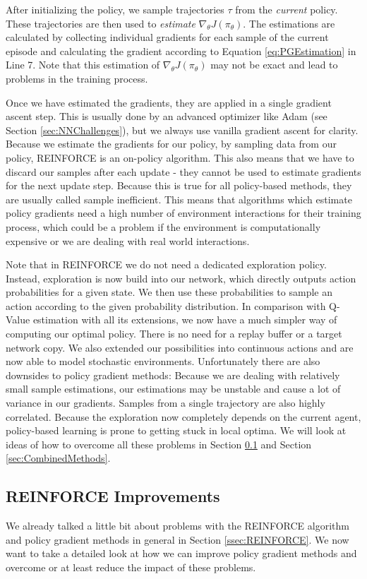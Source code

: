 After initializing the policy, we sample trajectories $\tau$ from the \textit{current} policy. These trajectories are then used to \textit{estimate} $\nabla_\theta J(\pi_\theta)$. The estimations are calculated by collecting individual gradients for each sample of the current episode and calculating the gradient according to Equation \ref{eq:PGEstimation} in Line 7. Note that this estimation of $\nabla_\theta J(\pi_\theta)$ may not be exact and lead to problems in the training process. 

Once we have estimated the gradients, they are applied in a single gradient ascent step. This is usually done by an advanced optimizer like Adam (see Section \ref{sec:NNChallenges}), but we always use vanilla gradient ascent for clarity. Because we estimate the gradients for our policy, by sampling data from our policy, REINFORCE is an on-policy algorithm. This also means that we have to discard our samples after each update - they cannot be used to estimate gradients for the next update step. Because this is true for all policy-based methods, they are usually called sample inefficient. This means that algorithms which estimate policy gradients need a high number of environment interactions for their training process, which could be a problem if the environment is computationally expensive or we are dealing with real world interactions.

Note that in REINFORCE we do not need a dedicated exploration policy. Instead, exploration is now build into our network, which directly outputs action probabilities for a given state. We then use these probabilities to sample an action according to the given probability distribution. In comparison with Q-Value estimation with all its extensions, we now have a much simpler way of computing our optimal policy. There is no need for a replay buffer or a target network copy. We also extended our possibilities into continuous actions and are now able to model stochastic environments. Unfortunately there are also downsides to policy gradient methods: Because we are dealing with relatively small sample estimations, our estimations may be unstable and cause a lot of variance in our gradients. Samples from a single trajectory are also highly correlated. Because the exploration now completely depends on the current agent, policy-based learning is prone to getting stuck in local optima. We will look at ideas of how to overcome all these problems in Section \ref{ssec:ImprovingPG} and Section \ref{sec:CombinedMethods}.

\subsection{REINFORCE Improvements} \label{ssec:ImprovingPG}
We already talked a little bit about problems with the REINFORCE algorithm and policy gradient methods in general in Section \ref{ssec:REINFORCE}. We now want to take a detailed look at how we can improve policy gradient methods and overcome or at least reduce the impact of these problems.

